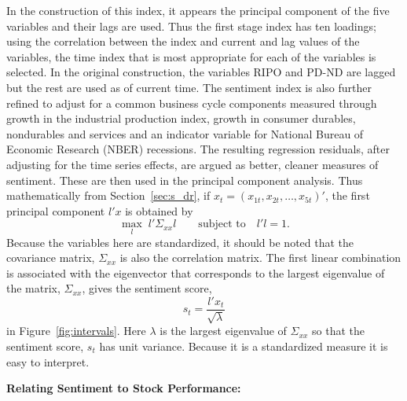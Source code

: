 In the construction of this index, it appears the principal component of the five variables and their lags are used. Thus the first stage index has ten loadings; using the correlation between the index and current and lag values of the variables, the time index that is most appropriate for each of the variables is selected. In the original construction, the variables RIPO and PD-ND are lagged but the rest are used as of current time. The sentiment index is also further refined to adjust for a common business cycle components measured through growth in the industrial production index, growth in consumer durables, nondurables and services and an indicator variable for National Bureau of Economic Research (NBER) recessions. The resulting regression residuals, after adjusting for the time series effects, are argued as better, cleaner measures of sentiment. These are then used in the principal component analysis. Thus mathematically from Section~\ref{sec:s_dr}, if $x_t= (x_{1t}, x_{2t}, \ldots, x_{5t})'$, the first principal component $l'x$ is obtained by
	\begin{equation}
	\max_l \; l' \textstyle \Sigma_{xx} l \qquad \text{subject to} \quad l'l=1.
	\end{equation}
Because the variables here are standardized, it should be noted that the covariance matrix, $\Sigma_{xx}$ is also the correlation matrix. The first linear combination is associated with the eigenvector that corresponds to the largest eigenvalue of the matrix, $\Sigma_{xx}$, gives the sentiment score,
	\begin{equation} \label{eq:stsqlambda}
	s_t= \dfrac{l' x_t}{\sqrt{\lambda}}
	\end{equation}
in Figure~\ref{fig:intervals}. Here $\lambda$ is the largest eigenvalue of $\Sigma_{xx}$ so that the sentiment score, $s_t$ has unit variance. Because it is a standardized measure it is easy to interpret. \twomedskip


\noindent\textbf{Relating Sentiment to Stock Performance:} \twomedskip


